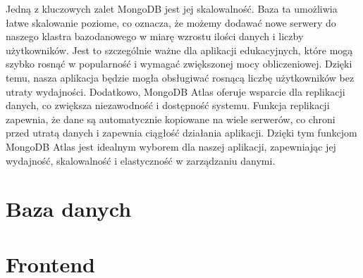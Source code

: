 Jedną z kluczowych zalet MongoDB jest jej skalowalność. Baza ta umożliwia łatwe skalowanie poziome, co oznacza, że możemy dodawać nowe serwery do naszego klastra bazodanowego w miarę wzrostu ilości danych i liczby użytkowników. Jest to szczególnie ważne dla aplikacji edukacyjnych, które mogą szybko rosnąć w popularność i wymagać zwiększonej mocy obliczeniowej. Dzięki temu, nasza aplikacja będzie mogła obsługiwać rosnącą liczbę użytkowników bez utraty wydajności. Dodatkowo, MongoDB Atlas oferuje wsparcie dla replikacji danych, co zwiększa niezawodność i dostępność systemu. Funkcja replikacji zapewnia, że dane są automatycznie kopiowane na wiele serwerów, co chroni przed utratą danych i zapewnia ciągłość działania aplikacji. Dzięki tym funkcjom MongoDB Atlas jest idealnym wyborem dla naszej aplikacji, zapewniając jej wydajność, skalowalność i elastyczność w zarządzaniu danymi.

\section{Baza danych}


\section{Frontend}
